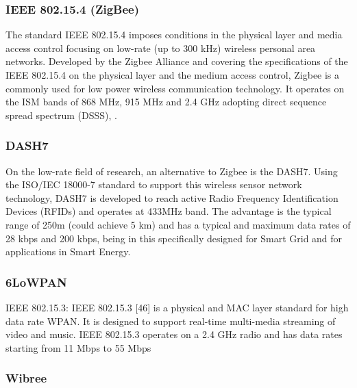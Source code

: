 \subsubsection{IEEE 802.15.4 (ZigBee)}

The standard IEEE 802.15.4 imposes conditions in the physical layer and media access control focusing on low-rate (up to 300 kHz) wireless personal area networks. Developed by the Zigbee Alliance and covering the specifications of the IEEE 802.15.4 on the physical layer and the medium access control, Zigbee is a commonly used for low power wireless communication technology. It operates on the ISM bands of 868 MHz, 915 MHz and 2.4 GHz adopting direct sequence spread spectrum (DSSS), \cite{Usman2013}.



\subsubsection{DASH7}

On the low-rate field of research, an alternative to Zigbee is the DASH7. Using the ISO/IEC 18000-7 standard to support this wireless sensor network technology, DASH7 is developed to reach active Radio Frequency Identification Devices (RFIDs) and operates at 433MHz band. The advantage is the typical range of 250m (could achieve 5 km) and has a typical and maximum data rates of 28 kbps and 200 kbps, being in this specifically designed for Smart Grid and for applications in Smart Energy.


\subsubsection{6LoWPAN}

IEEE 802.15.3: IEEE 802.15.3 [46] is a physical and MAC
layer standard for high data rate WPAN. It is designed to
support real-time multi-media streaming of video and music.
IEEE 802.15.3 operates on a 2.4 GHz radio and has data
rates starting from 11 Mbps to 55 Mbps

\subsubsection{Wibree}

